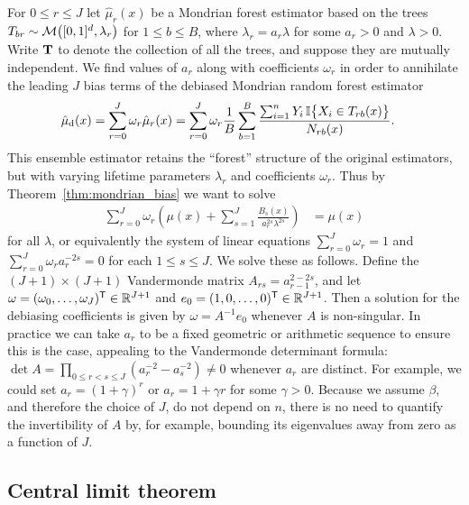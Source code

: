 For $0 \leq r \leq J$ let $\hat \mu_r(x)$ be a Mondrian forest estimator
based on the trees $T_{b r} \sim \mathcal{M}\big([0,1]^d, \lambda_r \big)$
for $1 \leq b \leq B$, where $\lambda_r = a_r \lambda$ for some $a_r > 0$
and $\lambda > 0$. Write $\mathbf{T}$ to denote the collection of all the trees,
and suppose they are mutually independent. We find values of $a_r$ along with
coefficients $\omega_r$ in order to annihilate the leading $J$ bias terms of
the debiased Mondrian random forest estimator
%
\begin{align}
  \label{eq:mondrian_debiased}
  \hat \mu_{\mathrm{d}}(x)
  &= \sum_{r=0}^J \omega_r \hat \mu_r(x)
  = \sum_{r=0}^{J} \omega_r
  \frac{1}{B} \sum_{b=1}^B
  \frac{\sum_{i=1}^n Y_i \, \mathbb{I}\big\{ X_i \in T_{r b}(x) \big\}} {N_{r b}(x)}.
\end{align}
%
This ensemble estimator retains the ``forest'' structure of the original
estimators, but with varying lifetime parameters $\lambda_r$ and coefficients
$\omega_r$. Thus by Theorem~\ref{thm:mondrian_bias} we want to solve
%
\begin{align*}
  \sum_{r=0}^{J} \omega_r
  \left( \mu(x) + \sum_{s=1}^{J} \frac{B_{s}(x)}{a_r^{2s} \lambda^{2s}} \right)
  &= \mu(x)
\end{align*}
%
for all $\lambda$, or equivalently the system of linear equations
$\sum_{r=0}^{J} \omega_r = 1$
and $\sum_{r=0}^{J} \omega_r a_r^{-2s} = 0$ for each $1 \leq s \leq J$.
We solve these as follows. Define the $(J+1) \times (J+1)$ Vandermonde matrix
$A_{r s} = a_{r-1}^{2-2s}$,
and let $\omega = (\omega_0, \ldots, \omega_J)^{\mathsf{T}} \in \mathbb{R}^{J+1}$
and $e_0 = (1, 0, \ldots, 0)^{\mathsf{T}} \in \mathbb{R}^{J+1}$.
Then a solution for the debiasing coefficients is given by
$\omega = A^{-1} e_0$ whenever $A$ is non-singular.
In practice we can take $a_r$ to be a fixed geometric or arithmetic sequence
to ensure this is the case, appealing to the Vandermonde determinant formula:
$\det A = \prod_{0 \leq r < s \leq J} (a_r^{-2} - a_s^{-2})
\neq 0$ whenever $a_r$ are distinct. For example, we could set
$a_r = (1 + \gamma)^r$ or $a_r = 1 + \gamma r$ for some $\gamma > 0$.
Because we assume $\beta$, and therefore the choice of $J$, do not
depend on $n$, there is no need to quantify
the invertibility of $A$ by, for example, bounding its eigenvalues
away from zero as a function of $J$.

\subsection{Central limit theorem}

